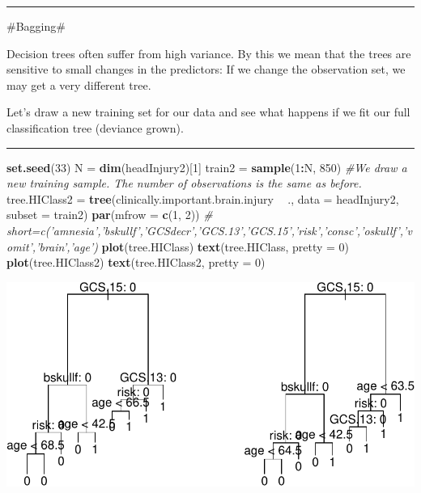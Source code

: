 \documentclass[]{article}
\newenvironment{Shaded}{\begin{snugshade}}{\end{snugshade}}
\newcommand{\CommentTok}[1]{\textcolor[rgb]{0.56,0.35,0.01}{\textit{#1}}}
\newcommand{\DataTypeTok}[1]{\textcolor[rgb]{0.13,0.29,0.53}{#1}}
\newcommand{\DecValTok}[1]{\textcolor[rgb]{0.00,0.00,0.81}{#1}}
\newcommand{\KeywordTok}[1]{\textcolor[rgb]{0.13,0.29,0.53}{\textbf{#1}}}
\newcommand{\NormalTok}[1]{#1}
\newcommand{\OperatorTok}[1]{\textcolor[rgb]{0.81,0.36,0.00}{\textbf{#1}}}
\newcommand{\StringTok}[1]{\textcolor[rgb]{0.31,0.60,0.02}{#1}}
\begin{document}
\begin{center}\rule{0.5\linewidth}{\linethickness}\end{center}

\#Bagging\#

Decision trees often suffer from high variance. By this we mean that the
trees are sensitive to small changes in the predictors: If we change the
observation set, we may get a very different tree.

Let's draw a new training set for our data and see what happens if we
fit our full classification tree (deviance grown).

\begin{center}\rule{0.5\linewidth}{\linethickness}\end{center}

\begin{Shaded}
\begin{Highlighting}[]
\KeywordTok{set.seed}\NormalTok{(}\DecValTok{33}\NormalTok{)}
\NormalTok{N =}\StringTok{ }\KeywordTok{dim}\NormalTok{(headInjury2)[}\DecValTok{1}\NormalTok{]}
\NormalTok{train2 =}\StringTok{ }\KeywordTok{sample}\NormalTok{(}\DecValTok{1}\OperatorTok{:}\NormalTok{N, }\DecValTok{850}\NormalTok{)  }\CommentTok{#We draw a new training sample. The number of observations is the same as before.}
\NormalTok{tree.HIClass2 =}\StringTok{ }\KeywordTok{tree}\NormalTok{(clinically.important.brain.injury }\OperatorTok{~}\StringTok{ }\NormalTok{., }\DataTypeTok{data =}\NormalTok{ headInjury2, }
    \DataTypeTok{subset =}\NormalTok{ train2)}
\KeywordTok{par}\NormalTok{(}\DataTypeTok{mfrow =} \KeywordTok{c}\NormalTok{(}\DecValTok{1}\NormalTok{, }\DecValTok{2}\NormalTok{))}
\CommentTok{# short=c('amnesia','bskullf','GCSdecr','GCS.13','GCS.15','risk','consc','oskullf','vomit','brain','age')}
\KeywordTok{plot}\NormalTok{(tree.HIClass)}
\KeywordTok{text}\NormalTok{(tree.HIClass, }\DataTypeTok{pretty =} \DecValTok{0}\NormalTok{)}
\KeywordTok{plot}\NormalTok{(tree.HIClass2)}
\KeywordTok{text}\NormalTok{(tree.HIClass2, }\DataTypeTok{pretty =} \DecValTok{0}\NormalTok{)}
\end{Highlighting}
\end{Shaded}

\includegraphics{8Trees_files/figure-latex/unnamed-chunk-25-1.pdf}
\end{document}
